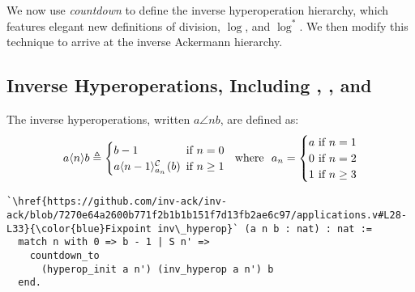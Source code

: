 We now use \emph{countdown} to define the inverse
hyperoperation hierarchy, which features elegant new definitions of
division, $\log$, and $\log^{*}$.
We then modify this technique to arrive at the inverse
Ackermann hierarchy.

\subsection{Inverse Hyperoperations, Including , , and }

\begin{defn} \label{defn: inv-hyperop}
	The inverse hyperoperations, written $a\angle{n}b$, are defined as:
	\begin{equation}
  a\angle{n}b \triangleq \begin{cases}
  b - 1 & \hspace{-5pt}\text{if } n = 0 \\
  \cdt{a\angle{n-1}}{a_n}(b) & \hspace{-5pt}\text{if } n \ge 1
  \end{cases}
   \ \text{ where } \ a_n = \begin{cases}
   a & \hspace{-10pt}\text{ if } n = 1 \\
   0 & \hspace{-10pt}\text{ if } n = 2 \\
  1 & \hspace{-10pt}\text{ if } n \ge 3
  \end{cases}
\end{equation}
\begin{lstlisting}
`\href{https://github.com/inv-ack/inv-ack/blob/7270e64a2600b771f2b1b1b151f7d13fb2ae6c97/applications.v#L28-L33}{\color{blue}Fixpoint inv\_hyperop}` (a n b : nat) : nat :=
  match n with 0 => b - 1 | S n' =>
    countdown_to
      (hyperop_init a n') (inv_hyperop a n') b
  end.
\end{lstlisting}
\end{defn}
